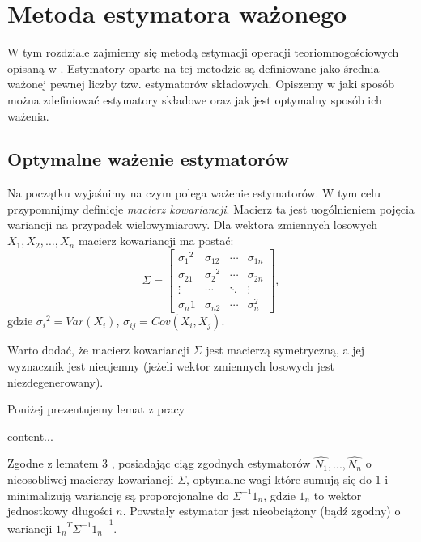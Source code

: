 \chapter{Metoda estymatora ważonego}
\thispagestyle{chapterBeginStyle}




W tym rozdziale zajmiemy się metodą estymacji operacji teoriomnogościowych opisaną w \cite{ting}. Estymatory oparte na tej metodzie są definiowane jako średnia ważonej pewnej liczby  tzw. estymatorów składowych. Opiszemy w jaki sposób można zdefiniować estymatory składowe oraz jak jest optymalny sposób ich ważenia. 

\section{Optymalne ważenie estymatorów}
Na początku wyjaśnimy na czym polega ważenie estymatorów.
W tym celu przypomnijmy definicje \textit{macierz kowariancji}. Macierz ta jest uogólnieniem pojęcia wariancji na przypadek wielowymiarowy. Dla wektora zmiennych losowych $X_1, X_2, \ldots, X_n$ macierz kowariancji ma postać:
\[
\Sigma =
  \begin{bmatrix}
    {{\sigma}_1}^2 & {\sigma}_{12} & \cdots & {\sigma}_{1n}  \\
    {{\sigma}_21} & {{\sigma}_{2}}^2 & \cdots & {\sigma}_{2n} \\
    \vdots & \cdots & \ddots & \vdots \\
    {{\sigma}_n1} & {{\sigma}_{n2}} & \cdots & {{\sigma}_{n}^2}
  \end{bmatrix},
\]
gdzie
    ${{\sigma}_i}^2 = Var(X_i)$,
    ${\sigma}_{ij} = Cov(X_i, X_j)$.

Warto dodać, że macierz kowariancji $\Sigma$ jest macierzą symetryczną, a jej wyznacznik jest nieujemny (jeżeli wektor zmiennych losowych jest niezdegenerowany).  

Poniżej prezentujemy lemat z pracy  \cite{ting}

\begin{lemma}
content...
\end{lemma}

Zgodne z lematem 3 \cite{ting}, posiadając ciąg zgodnych estymatorów $\hat{N_1}, ..., \hat{N_n}$ o nieosobliwej macierzy kowariancji $\Sigma$, optymalne wagi które sumują się do $1$ i minimalizują wariancję są proporcjonalne do $\Sigma^{-1}1_n$, gdzie $1_n$ to wektor jednostkowy długości $n$. Powstały estymator jest nieobciążony (bądź zgodny) o wariancji ${{1_n}^{T}\Sigma^{-1}1_n}^{-1}$.


